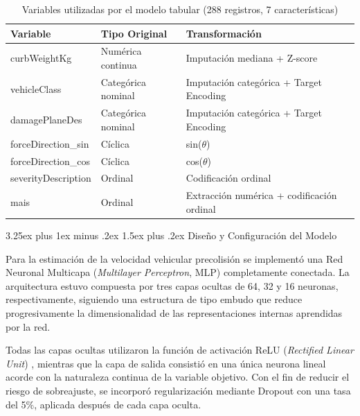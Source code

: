 \documentclass[esp]{SpeedEstimationAI_paper}
\makeatletter
\renewcommand{\paragraph}{%
  \@startsection{paragraph}{4}{0mm}%
  {3.25ex plus 1ex minus .2ex}%
  {1.5ex plus .2ex}%
  {\normalfont\normalsize\bfseries}%
}
\makeatother
\begin{document}
\begin{table}[H]
\caption{Variables utilizadas por el modelo tabular (288 registros, 7 características)}
\label{tab:tabFeaturesTabular}
\centering
\footnotesize
\setlength{\tabcolsep}{2pt}
\renewcommand{\arraystretch}{1.05}

\begin{tabular}{|p{2.4cm}|p{2.4cm}|p{2.6cm}|}
\hline
\textbf{Variable} &
\textbf{Tipo Original} &
\textbf{Transformación} \\
\hline

curbWeightKg &
Numérica continua &
Imputación mediana + Z-score \\
\hline

vehicleClass &
Categórica nominal &
Imputación categórica + Target Encoding \\
\hline

damagePlaneDes &
Categórica nominal &
Imputación categórica + Target Encoding \\
\hline

forceDirection\_sin &
Cíclica &
sin($\theta$) \\
\hline

forceDirection\_cos &
Cíclica &
cos($\theta$) \\
\hline

severityDescription &
Ordinal &
Codificación ordinal \\
\hline

mais &
Ordinal &
Extracción numérica + codificación ordinal \\
\hline

\end{tabular}
\end{table}

\paragraph{Diseño y Configuración del Modelo}

Para la estimación de la velocidad vehicular precolisión se implementó una Red Neuronal Multicapa (\textit{Multilayer Perceptron}, MLP) completamente conectada. La arquitectura estuvo compuesta por tres capas ocultas de 64, 32 y 16 neuronas, respectivamente, siguiendo una estructura de tipo embudo que reduce progresivamente la dimensionalidad de las representaciones internas aprendidas por la red.

Todas las capas ocultas utilizaron la función de activación ReLU (\textit{Rectified Linear Unit}) \cite{nair2010relu}, mientras que la capa de salida consistió en una única neurona lineal acorde con la naturaleza continua de la variable objetivo. Con el fin de reducir el riesgo de sobreajuste, se incorporó regularización mediante Dropout con una tasa del 5\%, aplicada después de cada capa oculta.
\end{document}
